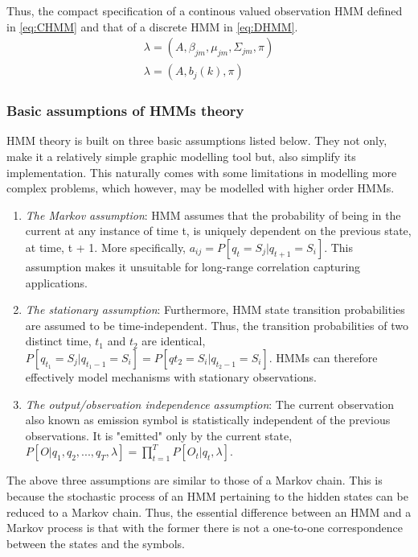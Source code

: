 Thus, the compact specification of a continous valued observation HMM defined in \ref{eq:CHMM} and that of a discrete HMM in \ref{eq:DHMM}.
\begin{align} 
	\lambda = (A, \beta_{jm}, \mu_{jm}, \Sigma_{jm}, \pi) \label{eq:CHMM} \\
	\lambda = (A, b_j(k), \pi) \label{eq:DHMM}
\end{align}

\subsubsection{Basic assumptions of HMMs theory}
HMM theory is built on three basic assumptions listed below. They not only, make it a relatively simple graphic modelling tool but, also simplify its implementation. This naturally comes with some limitations in modelling more complex problems, which however, may be modelled with higher order HMMs. %
\begin{enumerate}
\item \textit{The Markov assumption}: HMM assumes that the probability of being in the current	at any instance of time t, is uniquely dependent on the previous state, at time, t + 1. More specifically, \(a_{ij} = P[q_t = S_j|q_{t+1}=S_i]\). This assumption makes it unsuitable for long-range correlation capturing applications.
\item \textit{The stationary assumption}: Furthermore, HMM state transition probabilities are assumed to be time-independent. Thus, the transition probabilities of two distinct time, \(t_1\) and \(t_2\) are identical, \(P[q_{t_1} = S_j|q_{t_1 -1} = S_i] = P[q{t_2}=S_i|q_{t_2-1} = S_i]\). HMMs can therefore effectively model mechanisms with stationary observations.
\item \textit{The output/observation independence assumption}: The current observation also known as emission symbol is statistically independent of the previous observations. It is "emitted" only by the current state, \(P[O|q_1, q_2, ..., q_T, \lambda]=\prod_{t=1}^{T}P[O_t|q_t, \lambda]\).
\end{enumerate} 
The above three assumptions are similar to those of a Markov chain. This is because the stochastic process of an HMM pertaining to the hidden states can be reduced to a Markov chain. Thus, the essential difference between an HMM and a Markov process is that with the former there is not a one-to-one correspondence between the states and the symbols. %

